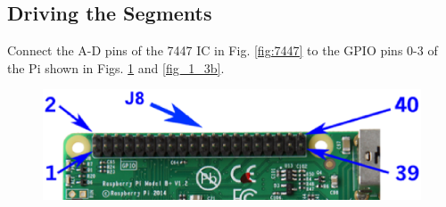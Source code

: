 \subsection{Driving the Segments}
\begin{problem}
Connect the A-D pins of the 7447 IC  in Fig. \ref{fig:7447} to the GPIO pins  0-3 of the Pi shown in Figs. \ref{fig_1_3a} and \ref{fig_1_3b}.
\end{problem}	
\renewcommand{\thefigure}{\theproblem.\arabic{figure}}
\begin{figure}[!ht]
\begin{center}
\includegraphics[width=\columnwidth]{./figs/gpio2}
\end{center}
\label{fig_1_3a}	
\end{figure}
%
